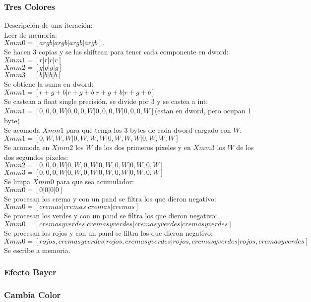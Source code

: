 \subsubsection{Tres Colores}
Descripción de una iteración:\\
Leer de memoria:\\
$Xmm0 = [argb| argb| argb | argb].$\\
Se hacen 3 copias y se las shiftean para tener cada componente en dword:\\ 
$Xmm1 = [r| r| r| r]$\\
$Xmm2 = [g| g| g| g]$\\
$Xmm3 = [b| b| b| b]$\\
Se obtiene la suma en dword:\\
$Xmm1 = [r+g+b| r+g+b| r+g+b| r+g+b]$\\
Se castean a float single precisión, se divide por 3 y se castea a int:\\
$Xmm1 = [0,0,0,W| 0,0,0,W| 0,0,0,W| 0,0,0,W]$(estan en dword, pero ocupan 1 byte)\\
Se acomoda $Xmm1$ para que tenga los 3 bytes de cada dword cargado con $W$:\\
$Xmm1 = [0,W,W,W| 0,W,W,W| 0,W,W,W| 0,W,W,W]$\\
Se acomoda en $Xmm2$ los $W$ de los dos primeros píxeles y en $Xmm3$ los $W$ de los dos segundos píxeles:\\
$Xmm2 = [0,0,0,W|0,W,0,W|0,W,0,W|0,W,0,W]$\\
$Xmm3 = [0,0,0,W|0,W,0,W|0,W,0,W|0,W,0,W]$\\
Se limpa $Xmm0$ para que sea acumulador:\\
$Xmm0 = [0|0|0|0]$\\
Se procesan los crema y con un pand se filtra los que dieron negativo:\\
$Xmm0 = [cremas|cremas|cremas|cremas]$\\
Se procesan los verdes y con un pand se filtra los que dieron negativo:\\
$Xmm0 = [cremas y verdes|cremas y verdes|cremas y verdes|cremas y verdes]$\\
Se procesan los rojos y con un pand se filtra los que dieron negativo:\\
$Xmm0 = [rojos, cremas y verdes|rojos, cremas y verdes|rojos, cremas y verdes|rojos, cremas y verdes]$\\
Se escribe a memoria.\\
\subsubsection{Efecto Bayer}
\subsubsection{Cambia Color}